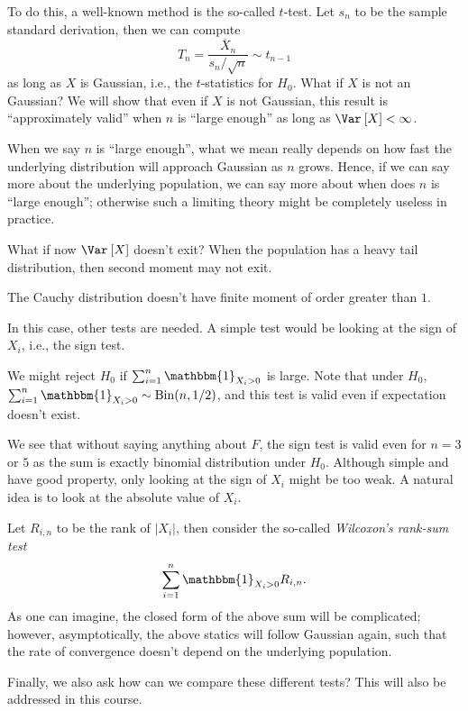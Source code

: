 To do this, a well-known method is the so-called \(t\)-test. Let \(s_n\) to be the sample standard derivation, then we can compute
\[
	T_n = \frac{\overline{X} _n}{s_n / \sqrt{n} } \sim t_{n-1}
\]
as long as \(X\) is Gaussian, i.e., the \(t\)-statistics for \(H_0\). What if \(X\) is not an Gaussian? We will show that even if \(X\) is not Gaussian, this result is ``approximately valid'' when \(n\) is ``large enough'' as long as \(\Var_{}\left[X \right] < \infty \).

\begin{remark}
	When we say \(n\) is ``large enough'', what we mean really depends on how fast the underlying distribution will approach Gaussian as \(n\) grows. Hence, if we can say more about the underlying population, we can say more about when does \(n\) is ``large enough''; otherwise such a limiting theory might be completely useless in practice.
\end{remark}

What if now \(\Var_{}\left[X \right] \) doesn't exit? When the population has a heavy tail distribution, then second moment may not exit.

\begin{eg}
	The Cauchy distribution doesn't have finite moment of order greater than \(1\).
\end{eg}

In this case, other tests are needed. A simple test would be looking at the sign of \(X_i\), i.e., the sign test.

\begin{eg}
	We might reject \(H_0\) if \(\sum_{i=1}^{n} \mathbbm{1}_{X_i > 0} \) is large. Note that under \(H_0\), \(\sum_{i=1}^{n} \mathbbm{1}_{X_i > 0} \sim \operatorname{Bin}(n, 1/2) \), and this test is valid even if expectation doesn't exist.
\end{eg}

We see that without saying anything about \(F\), the sign test is valid even for \(n = 3\) or \(5\) as the sum is exactly binomial distribution under \(H_0\). Although simple and have good property, only looking at the sign of \(X_i\) might be too weak. A natural idea is to look at the absolute value of \(X_i\).

\begin{eg}
	Let \(R_{i, n} \) to be the rank of \(\vert X_i \vert \), then consider the so-called \emph{Wilcoxon's rank-sum test}
	\[
		\sum_{i=1}^{n} \mathbbm{1}_{X_i > 0} R_{i, n}.
	\]
	As one can imagine, the closed form of the above sum will be complicated; however, asymptotically, the above statics will follow Gaussian again, such that the rate of convergence doesn't depend on the underlying population.
\end{eg}

Finally, we also ask how can we compare these different tests? This will also be addressed in this course.